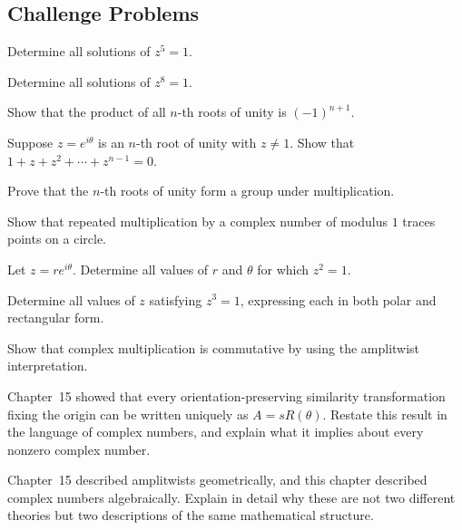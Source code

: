 \subsection*{Challenge Problems}
\begin{exercise}
Determine all solutions of $z^5=1$.
\end{exercise}
\begin{exercise}
Determine all solutions of $z^8=1$.
\end{exercise}
\begin{exercise}
Show that the product of all $n$-th roots of unity is $(-1)^{n+1}$.
\end{exercise}
\begin{exercise}
Suppose $z=e^{i\theta}$ is an $n$-th root of unity with $z\neq1$. Show
that $1+z+z^2+\cdots+z^{n-1}=0$.
\end{exercise}
\begin{exercise}
Prove that the $n$-th roots of unity form a group under multiplication.
\end{exercise}
\begin{exercise}
Show that repeated multiplication by a complex number of modulus $1$
traces points on a circle.
\end{exercise}
\begin{exercise}
Let $z=re^{i\theta}$. Determine all values of $r$ and $\theta$ for which
$z^2=1$.
\end{exercise}
\begin{exercise}
Determine all values of $z$ satisfying $z^3=1$, expressing each in both
polar and rectangular form.
\end{exercise}
\begin{exercise}
Show that complex multiplication is commutative by using the amplitwist
interpretation.
\end{exercise}
\begin{exercise}
Chapter~15 showed that every orientation-preserving similarity
transformation fixing the origin can be written uniquely as $A =
sR(\theta)$. Restate this result in the language of complex numbers, and
explain what it implies about every nonzero complex number.
\end{exercise}
\begin{exercise}
Chapter~15 described amplitwists geometrically, and this chapter
described complex numbers algebraically. Explain in detail why these are
not two different theories but two descriptions of the same mathematical
structure.
\end{exercise}

